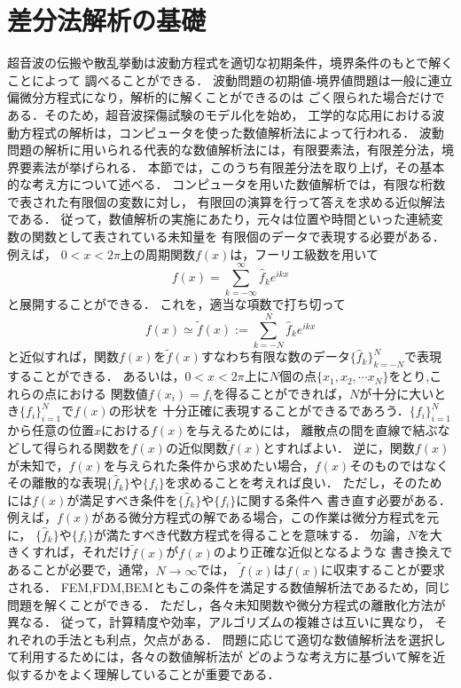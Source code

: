 \documentclass[10pt,a4j,dvipdfmx]{jarticle}
\begin{document}
\section{差分法解析の基礎}
超音波の伝搬や散乱挙動は波動方程式を適切な初期条件，境界条件のもとで解くことによって
調べることができる．
波動問題の初期値-境界値問題は一般に連立偏微分方程式になり，解析的に解くことができるのは
ごく限られた場合だけである．そのため，超音波探傷試験のモデル化を始め，
工学的な応用における波動方程式の解析は，コンピュータを使った数値解析法によって行われる．
波動問題の解析に用いられる代表的な数値解析法には，有限要素法，有限差分法，境界要素法が挙げられる．
本節では，このうち有限差分法を取り上げ，その基本的な考え方について述べる．
コンピュータを用いた数値解析では，有限な桁数で表された有限個の変数に対し，
有限回の演算を行って答えを求める近似解法である．
従って，数値解析の実施にあたり，元々は位置や時間といった連続変数の関数として表されている未知量を
有限個のデータで表現する必要がある．例えば，
$0<x<2\pi$上の周期関数$f(x)$は，フーリエ級数を用いて
\begin{equation}
	f(x)=\sum_{k=-\infty}^{\infty} \hat{f}_ke^{ikx}
	\label{eqn:}
\end{equation}
と展開することができる．
これを，適当な項数で打ち切って
\begin{equation}
	f(x) \simeq \tilde f(x) :=\sum_{k=-N}^{N} \hat{f}_ke^{ikx}
	\label{eqn:}
\end{equation}
と近似すれば，関数$f(x)$を$\tilde f (x)$すなわち有限な数のデータ$\{ \hat{f}_k\}_{k=-N}^{N}$で表現することができる．
あるいは，$0<x<2\pi $上に$N$個の点$\{ x_1,x_2, \cdots x_N \}$をとり,これらの点における
関数値$f(x_i)=f_i$を得ることができれば，$N$が十分に大いとき$\{f_i\}_{i=1}^N$で$f(x)$の形状を
十分正確に表現することができるであろう．$\{ f_i \}_{i=1}^N$から任意の位置$x$における$f(x)$を与えるためには，
離散点の間を直線で結ぶなどして得られる関数を$f(x)$の近似関数$\tilde f(x)$とすればよい．
逆に，関数$f(x)$が未知で，$f(x)$を与えられた条件から求めたい場合，$f(x)$そのものではなく
その離散的な表現$\{\hat{f}_k\}$や$\{f_i\}$を求めることを考えれば良い．
ただし，そのためには$f(x)$が満足すべき条件を$\{\hat{f}_k\}$や$\{f_i\}$に関する条件へ
書き直す必要がある．例えば，$f(x)$がある微分方程式の解である場合，この作業は微分方程式を元に，
$\{\hat{f}_k\}$や$\{f_i\}$が満たすべき代数方程式を得ることを意味する．
勿論，$N$を大きくすれば，それだけ$\tilde f(x)$が$f(x)$のより正確な近似となるような
書き換えであることが必要で，通常，$N\rightarrow \infty$では，
$\tilde f(x)$は$f(x)$に収束することが要求される．
FEM,FDM,BEMともこの条件を満足する数値解析法であるため，同じ問題を解くことができる．
ただし，各々未知関数や微分方程式の離散化方法が異なる．
従って，計算精度や効率，アルゴリズムの複雑さは互いに異なり，
それぞれの手法とも利点，欠点がある．
問題に応じて適切な数値解析法を選択して利用するためには，各々の数値解析法が
どのような考え方に基づいて解を近似するかをよく理解していることが重要である．
\end{document}
